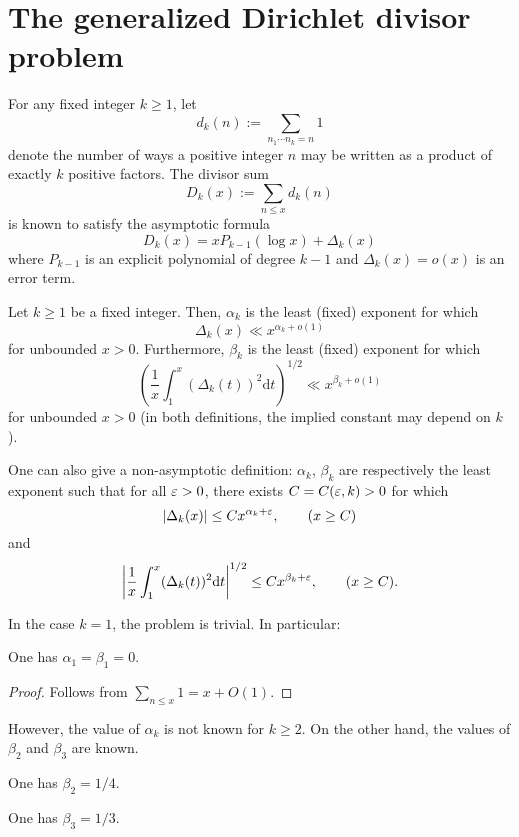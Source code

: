 \chapter{The generalized Dirichlet divisor problem}\label{divisor-chapter}

For any fixed integer $k \ge 1$, let 
\[
d_k(n) := \sum_{n_1 \cdots n_k = n}1
\]
denote the number of ways a positive integer $n$ may be written as a product of exactly $k$ positive factors. The divisor sum
\[
D_k(x) := \sum_{n \leq x} d_k(n)
\]
is known to satisfy the asymptotic formula 
\[
D_k(x) = x P_{k - 1}(\log x) + \Delta_k(x)
\]
where $P_{k - 1}$ is an explicit polynomial of degree $k-1$ and $\Delta_k(x) = o(x)$ is an error term.

\begin{definition}\label{divisor-def} Let $k \geq 1$ be a fixed integer. Then, $\alpha_k$ is the least (fixed) exponent for which
$$ \Delta_k(x) \ll x^{\alpha_k+o(1)}$$
for unbounded $x > 0$. Furthermore, $\beta_k$ is the least (fixed) exponent for which 
\[
\left(\frac{1}{x}\int_1^x (\Delta_k(t))^2\text{d}t\right)^{1/2} \ll x^{\beta_k + o(1)}
\]
for unbounded $x > 0$ (in both definitions, the implied constant may depend on $k$).
\end{definition}

One can also give a non-asymptotic definition: $\alpha_k$, $\beta_k$ are respectively the least exponent such that for all $\varepsilon > 0$, there exists $C = C(\varepsilon, k) > 0$ for which
\[
|\Delta_k(x)| \leq C x^{\alpha_k + \varepsilon},\qquad (x \ge C)
\]
and
\[
\left|\frac{1}{x}\int_1^x(\Delta_k(t))^2\text{d}t\right|^{1/2} \le Cx^{\beta_k + \varepsilon},\qquad (x \ge C).
\]

In the case $k = 1$, the problem is trivial. In particular:

\begin{lemma}[$d_1$ exponent]\label{divisor-1} One has $\alpha_1=\beta_1=0$.
\end{lemma}
\begin{proof}
Follows from $\sum_{n \le x}1 = x + O(1)$. 
\end{proof}

However, the value of $\alpha_k$ is not known for $k \ge 2$. On the other hand, the values of $\beta_2$ and $\beta_3$ are known.

\begin{theorem}\label{avg-divisor-2} 
One has $\beta_2 = 1/4$.
\end{theorem}
\begin{theorem}\label{avg-divisor-3} 
One has $\beta_3 = 1/3$.
\end{theorem}

